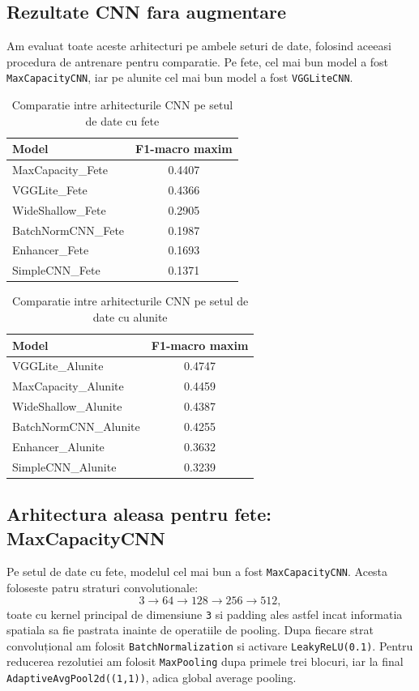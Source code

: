 \documentclass[12pt,a4paper]{article}
\begin{document}
\subsection{Rezultate CNN fara augmentare}

Am evaluat toate aceste arhitecturi pe ambele seturi de date, folosind aceeasi procedura de antrenare pentru comparatie. Pe fete, cel mai bun model a fost \texttt{MaxCapacityCNN}, iar pe alunite cel mai bun model a fost \texttt{VGGLiteCNN}.

\begin{table}[H]
\centering
\caption{Comparatie intre arhitecturile CNN pe setul de date cu fete}
\begin{tabular}{lc}
\toprule
Model & F1-macro maxim \\
\midrule
MaxCapacity\_Fete & 0.4407 \\
VGGLite\_Fete & 0.4366 \\
WideShallow\_Fete & 0.2905 \\
BatchNormCNN\_Fete & 0.1987 \\
Enhancer\_Fete & 0.1693 \\
SimpleCNN\_Fete & 0.1371 \\
\bottomrule
\end{tabular}
\end{table}

\begin{table}[H]
\centering
\caption{Comparatie intre arhitecturile CNN pe setul de date cu alunite}
\begin{tabular}{lc}
\toprule
Model & F1-macro maxim \\
\midrule
VGGLite\_Alunite & 0.4747 \\
MaxCapacity\_Alunite & 0.4459 \\
WideShallow\_Alunite & 0.4387 \\
BatchNormCNN\_Alunite & 0.4255 \\
Enhancer\_Alunite & 0.3632 \\
SimpleCNN\_Alunite & 0.3239 \\
\bottomrule
\end{tabular}
\end{table}

\subsection{Arhitectura aleasa pentru fete: MaxCapacityCNN}

Pe setul de date cu fete, modelul cel mai bun a fost \texttt{MaxCapacityCNN}. Acesta foloseste patru straturi convolutionale:
\[
3 \rightarrow 64 \rightarrow 128 \rightarrow 256 \rightarrow 512,
\]
toate cu kernel principal de dimensiune \texttt{3} si padding ales astfel incat informatia spatiala sa fie pastrata inainte de operatiile de pooling. Dupa fiecare strat convoluțional am folosit \texttt{BatchNormalization} si activare \texttt{LeakyReLU(0.1)}. Pentru reducerea rezolutiei am folosit \texttt{MaxPooling} dupa primele trei blocuri, iar la final \texttt{AdaptiveAvgPool2d((1,1))}, adica global average pooling.
\end{document}
